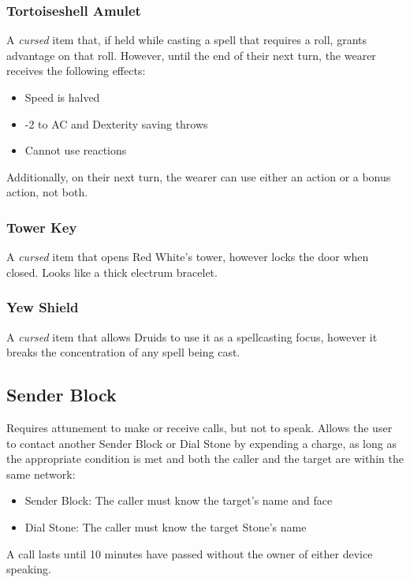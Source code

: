 \subsubsection{Tortoiseshell Amulet}
\label{items:tortoise}
A \textit{cursed} item that, if held while casting a spell that requires a roll, grants advantage on that roll. However, until the end of their next turn, the wearer receives the following effects:
\begin{itemize}
\item Speed is halved
\item -2 to AC and Dexterity saving throws
\item Cannot use reactions
\end{itemize}
Additionally, on their next turn, the wearer can use either an action or a bonus action, not both.

\subsubsection{Tower Key}
\label{items:redkey}
A \textit{cursed} item that opens Red White's tower, however locks the door when closed. Looks like a thick electrum bracelet.

\subsubsection{Yew Shield}
\label{items:yewshield}
A \textit{cursed} item that allows Druids to use it as a spellcasting focus, however it breaks the concentration of any spell being cast.




\subsection{Sender Block}
\label{items:senderblock}
Requires attunement to make or receive calls, but not to speak. Allows the user to contact another Sender Block or Dial Stone by expending a charge, as long as the appropriate condition is met and both the caller and the target are within the same network:
\begin{itemize}
\item     Sender Block: The caller must know the target's name and face
\item     Dial Stone: The caller must know the target Stone's name
\end{itemize}
A call lasts until 10 minutes have passed without the owner of either device speaking.



